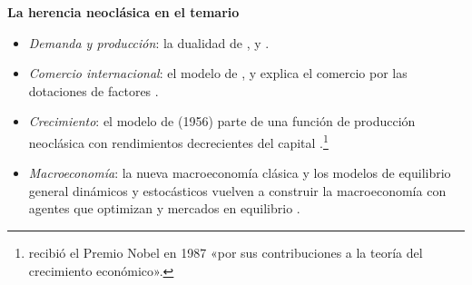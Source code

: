 \documentclass[11pt]{article}
\begin{document}
\begin{anotaciones}
\textbf{La herencia neoclásica en el temario}
\begin{itemize}
\item \emph{Demanda y producción}: la dualidad de ,  y   .
\item \emph{Comercio internacional}: el modelo de ,  y  explica el comercio por las dotaciones de factores .
\item \emph{Crecimiento}: el modelo de  (1956) parte de una función de producción neoclásica con rendimientos decrecientes del capital .\footnote{ recibió el Premio Nobel en 1987 «por sus contribuciones a la teoría del crecimiento económico»\nocite{Nobel1987Solow}.}
\item \emph{Macroeconomía}: la nueva macroeconomía clásica y los modelos de equilibrio general dinámicos y estocásticos vuelven a construir la macroeconomía con agentes que optimizan y mercados en equilibrio  .
\end{itemize}
\end{anotaciones}
\end{document}
